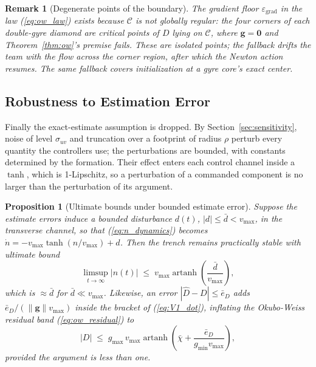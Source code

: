 \documentclass[lettersize,journal]{IEEEtran}
\newtheorem{proposition}{Proposition}
\newtheorem{remark}{Remark}
\begin{document}
\begin{remark}[Degenerate points of the boundary]
\label{rem:ow_corners}
The gradient floor $\varepsilon_{\text{grad}}$ in the law
(\ref{eq:ow_law}) exists because $\mathcal{C}$ is not globally regular:
the four corners of each double-gyre diamond are critical points of $D$
lying on $\mathcal{C}$, where $\mathbf{g} = \mathbf{0}$ and
Theorem~\ref{thm:ow}'s premise fails. These are isolated points; the
fallback drifts the team with the flow across the corner region, after
which the Newton action resumes. The same fallback covers
initialization at a gyre core's exact center.
\end{remark}

\subsection{Robustness to Estimation Error}
\label{sec:stab_iss}

Finally the exact-estimate assumption is dropped. By
Section~\ref{sec:sensitivity}, noise of level $\sigma_{uv}$ and
truncation over a footprint of radius $\rho$ perturb every quantity the
controllers use; the perturbations are bounded, with constants
determined by the formation. Their effect enters each control channel
inside a $\tanh$, which is 1-Lipschitz, so a perturbation of a
commanded component is no larger than the perturbation of its argument.

\begin{proposition}[Ultimate bounds under bounded estimate error]
\label{prop:iss}
Suppose the estimate errors induce a bounded disturbance $d(t)$, $|d|
\leq \bar{d} < v_{\max}$, in the transverse channel, so that
(\ref{eq:n_dynamics}) becomes $\dot{n} = -v_{\max}\tanh(n/v_{\max}) +
d$. Then the trench remains practically stable with ultimate bound
\begin{equation}
    \limsup_{t\to\infty} |n(t)| \;\leq\;
    v_{\max}\operatorname{artanh}\!\left(\frac{\bar{d}}{v_{\max}}\right),
    \label{eq:iss_bound}
\end{equation}
which is $\approx \bar{d}$ for $\bar{d} \ll v_{\max}$. Likewise, an
error $|\hat{D} - D| \leq \bar{e}_D$ adds $\bar{e}_D/(\|\mathbf{g}\|
v_{\max})$ inside the bracket of (\ref{eq:V1_dot}), inflating the
Okubo-Weiss residual band (\ref{eq:ow_residual}) to
\begin{equation}
    |D| \;\leq\; g_{\max}\,v_{\max}
    \operatorname{artanh}\!\left(\bar{\chi} +
    \frac{\bar{e}_D}{g_{\min} v_{\max}}\right),
    \label{eq:ow_residual_noisy}
\end{equation}
provided the argument is less than one.
\end{proposition}
\end{document}
